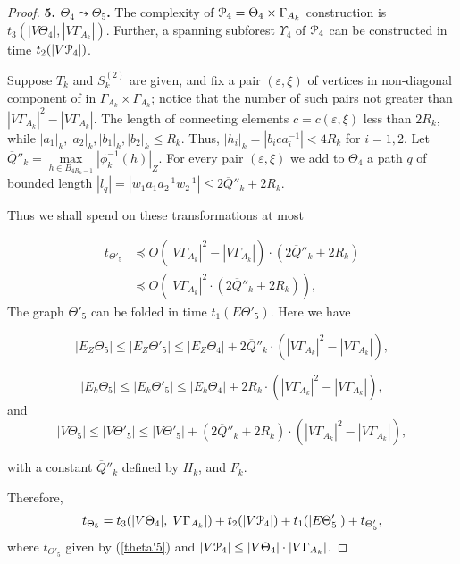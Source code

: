 \documentclass[a4paper,12pt]{article}
\newcommand{\G}{\Gamma }
\newcommand{\e}{\varepsilon }
\newcommand{\T}{\Theta }
\newcommand{\U}{\Upsilon }
\newcommand{\cP}{{\cal{P}}}
\numberwithin{equation}{section}
\numberwithin{figure}{section}
\begin{document}
\begin{proof}
{\bf 5. $\T_4 \leadsto \T_5$.} The complexity of $\cP_4=\T_4\times
\G_{A_k}$ construction is $t_3(|V \T_4|, |V \G_{A_k}|)$. Further,
 a spanning subforest $\U_4$ of $\cP_4$ can be constructed in time
$t_2(|V\cP_4|)$.

Suppose $T_k$ and $S^{(2)}_k$ are given, and fix a pair $(\e,\xi)
$ of vertices in non-diagonal component of in $\G_{A_k}\times
\G_{A_k}$; notice that the number of such pairs not greater than
$|V \G_{A_k}|^2-|V \G_{A_k}|$. The length of connecting elements
$c=c(\e,\xi)$ less than $2R_k$, while $|a_1|_k,|a_2|_k, |b_1|_k,
|b_2|_k \le R_k$. Thus, $|h_i|_k = |b_ica_i^{-1}| < 4R_k$ for
$i=1,2$. Let $\overline{Q}''_k=\max\limits_{h \in
B_{4R_k-1}}|\phi^{-1}_k(h)|_Z$. For every pair $(\e,\xi) $ we add
to $\T_4$ a path $q$ of bounded length $|l_q|= |w_1 a_1a_2^{-1}
w_2^{-1}| \le 2 \overline{Q}''_k +2 R_k$.

Thus we shall spend on these transformations at most

\begin{equation}\label{theta'5}
\begin{split}
t_{\T'_5} &\preceq O(|V \G_{A_k}|^2-|V \G_{A_k}|)\cdot(2\overline{Q}''_k+2R_k)\\
&\preceq O(|V \G_{A_k}|^2 \cdot (2\overline{Q}''_k+2R_k)),
\end{split}
\end{equation}
The graph $\T'_5$ can be folded in time $t_1(E\T'_5)$. Here we
have

\begin{equation}\label{eztheta5}
|E_Z\T_5| \le |E_Z\T'_5| \le |E_Z\T_4|+ 2\overline{Q}''_k\cdot(|V
\G_{A_k}|^2-|V \G_{A_k}|),
\end{equation}

\begin{equation}\label{ektheta5}
|E_k\T_5| \le |E_k\T'_5| \le  |E_k\T_4|+ 2R_k\cdot(|V
\G_{A_k}|^2-|V \G_{A_k}|),
\end{equation}
and
\begin{equation}\label{vtheta5}
|V\T_5| \le |V \T'_5| \le |V
\T'_5|+(2\overline{Q}''_k+2R_k)\cdot(|V \G_{A_k}|^2-|V \G_{A_k}|),
\end{equation}

with a constant $\overline{Q}''_k$ defined by $H_k$, and $F_k$.


Therefore,
\begin{equation}\label{theta5}
t_{\T_5} = t_3(|V \T_4|, |V \G_{A_k}|) + t_2(|V\cP_4|)+
t_1(|E\T'_5|) + t_{\T'_5},
\end{equation}
where $t_{\T'_5}$ given by (\ref{theta'5}) and $|V\cP_4| \le |V
\T_4|\cdot |V \G_{A_k}|$.



\end{proof}
\end{document}
